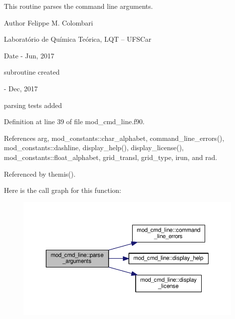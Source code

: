 This routine parses the command line arguments. 

\begin{DoxyAuthor}{Author}
Felippe M. Colombari
\begin{DoxyItemize}
\item Laboratório de Química Teórica, L\+QT -- U\+F\+S\+Car 
\end{DoxyItemize}
\end{DoxyAuthor}
\begin{DoxyDate}{Date}
-\/ Jun, 2017
\begin{DoxyItemize}
\item subroutine created 
\end{DoxyItemize}

-\/ Dec, 2017
\begin{DoxyItemize}
\item parsing tests added 
\end{DoxyItemize}
\end{DoxyDate}


Definition at line 39 of file mod\+\_\+cmd\+\_\+line.\+f90.



References arg, mod\+\_\+constants\+::char\+\_\+alphabet, command\+\_\+line\+\_\+errors(), mod\+\_\+constants\+::dashline, display\+\_\+help(), display\+\_\+license(), mod\+\_\+constants\+::float\+\_\+alphabet, grid\+\_\+transl, grid\+\_\+type, irun, and rad.



Referenced by themis().



Here is the call graph for this function\+:\nopagebreak
\begin{figure}[H]
\begin{center}
\leavevmode
\includegraphics[width=350pt]{namespacemod__cmd__line_af3e6d85ae8e1f68f4c7c22e40bd3f3bb_cgraph}
\end{center}
\end{figure}




